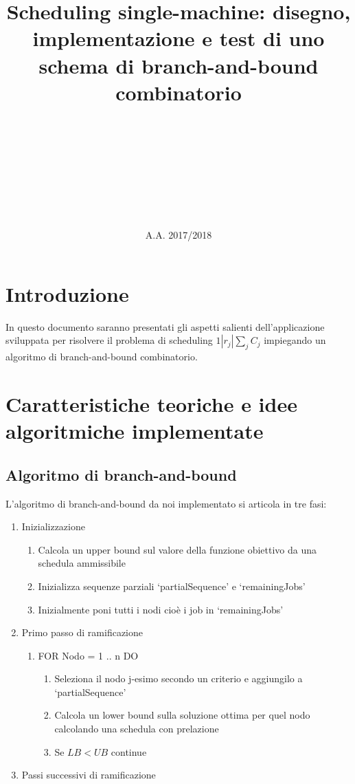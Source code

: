\documentclass[a4paper]{article}
\title{Scheduling single-machine: disegno, implementazione e test di uno schema di branch-and-bound combinatorio\\
}
\author{
	\text{Carmine Scarpitta}\\
	\text{email}\\
	\text{matricola}
	\and
	\text{Elly Schmidt}\\
	\text{email}\\
	\text{matricola}
	\and
	\text{Davide Romano Tranzocchi}\\
	\text{email}\\
	\text{matricola}
}
\date{A.A. 2017/2018}
\begin{document}
\maketitle

\newpage

\tableofcontents

\section{Introduzione}
In questo documento saranno presentati gli aspetti salienti dell'applicazione sviluppata per risolvere il problema di scheduling $1 | r_j | \sum_{j} C_j$ impiegando un algoritmo di branch-and-bound combinatorio.

\section{Caratteristiche teoriche e idee algoritmiche implementate}
\subsection{Algoritmo di branch-and-bound}
L'algoritmo di branch-and-bound da noi implementato si articola in tre fasi:
\begin{enumerate}
	\item Inizializzazione
	\begin{enumerate}
		\item Calcola un upper bound sul valore della funzione obiettivo da una schedula ammissibile
		\item Inizializza sequenze parziali ‘partialSequence’ e ‘remainingJobs’
		\item Inizialmente poni tutti i nodi cioè i job in ‘remainingJobs’
	\end{enumerate}
	\item Primo passo di ramificazione
	\begin{enumerate}
		\item FOR Nodo = 1 .. n DO
		\begin{enumerate}
			\item Seleziona il nodo j-esimo secondo un criterio e aggiungilo a ‘partialSequence’
			\item Calcola un lower bound sulla soluzione ottima per quel nodo calcolando una schedula con prelazione
			\item Se $LB < UB$ continue
		\end{enumerate}
	\end{enumerate}
	\item Passi successivi di ramificazione
	
\end{enumerate}
\end{document}
